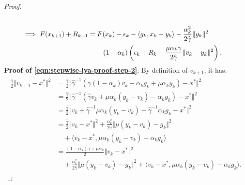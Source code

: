 \documentclass[12pt]{article}
\begin{document}
\begin{proof}
\begin{align}
            \notag
            \\
            \implies
            F(x_{k + 1}) + R_{k + 1}
            &=
            F(x_k) - \epsilon_k - \langle  g_k, x_k - y_k\rangle
            - \frac{\alpha_k^2}{2\hat \gamma}\Vert g_k\Vert^2
            \notag
            \\
            &\quad
                +
                (1 - \alpha_k)
                \left(
                    \epsilon_k + R_k +
                    \frac{\mu\alpha_k\gamma}{2\hat \gamma}
                    \Vert v_k - y_k\Vert^2
                \right).
        \end{align}
        \textbf{Proof of \eqref{eqn:stepwise-lya-proof-step-2}}:
        By definition of $v_{k + 1}$, it has:
        \begin{align}\label{eqn:stepwise-lya-proof-eqn2}\begin{split}
            \frac{\hat \gamma}{2}\Vert v_{k + 1} - x^* \Vert^2
            &=
            \frac{\hat \gamma}{2}\Vert
                \hat \gamma^{-1}
                (
                    \gamma(1 - \alpha_k)v_k -
                    \alpha_k g_k + \mu \alpha_k y_k
                )
                - x^*
            \Vert^2
            \\
            &=
            \frac{\hat \gamma}{2}
            \Vert
                \hat \gamma^{-1}
                (
                \hat \gamma v_k + \mu \alpha_k(y_k - v_k)
                    - \alpha_k g_k
                )
                - x^*
            \Vert^2
            \\
            &=
            \frac{\hat \gamma}{2}
            \Vert
                v_k + \hat \gamma^{-1} \mu \alpha_k (y_k - v_k)
                - \hat \gamma^{-1}\alpha_k g_k
                - x^*
            \Vert^2
            \\
            &=
            \frac{\hat \gamma}{2}
            \Vert v_k - x^*\Vert^2
            +
            \frac{\alpha_k^2}{2\hat \gamma}\Vert \mu(y_k - v_k) - g_k\Vert^2
            \\ &\quad
                +
                \langle v_k - x^*, \mu \alpha_k(y_k - v_k) - \alpha_k g_k\rangle
            \\
            &=
            \frac{(1 - \alpha_k)\gamma + \mu \alpha_k}{2} \Vert v_k - x^*\Vert^2
            \\ &\quad
                +
                \frac{\alpha_k^2}{2\hat \gamma}
                \Vert \mu(y_k - v_k) - g_k\Vert^2
                +
                \langle v_k - x^*, \mu \alpha_k(y_k - v_k) - \alpha_k g_k\rangle.

\end{split}
\end{align}
\end{proof}
\end{document}
